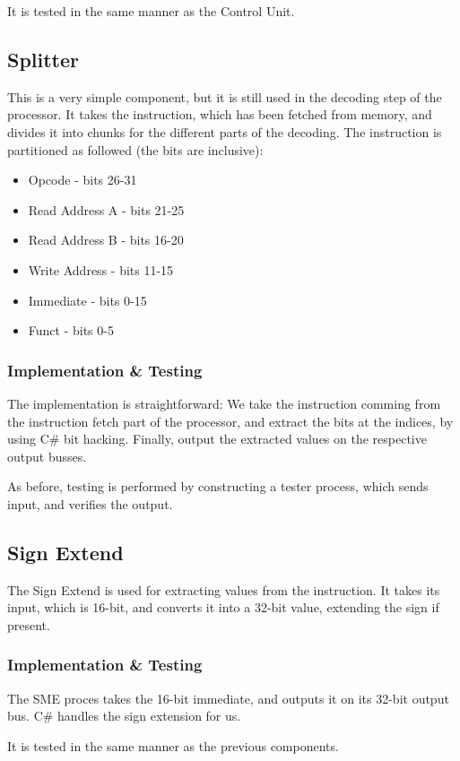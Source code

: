 It is tested in the same manner as the Control Unit.

\subsection{Splitter}
This is a very simple component, but it is still used in the decoding step of
the processor. It takes the instruction, which has been fetched from memory,
and divides it into chunks for the different parts of the decoding. The
instruction is partitioned as followed (the bits are inclusive):
\begin{itemize}
    \item Opcode - bits 26-31
    \item Read Address A - bits 21-25
    \item Read Address B - bits 16-20
    \item Write Address - bits 11-15
    \item Immediate - bits 0-15
    \item Funct - bits 0-5
\end{itemize}

\subsubsection*{Implementation \& Testing}
The implementation is straightforward: We take the instruction comming from the
instruction fetch part of the processor, and extract the bits at the indices,
by using C\# bit hacking. Finally, output the extracted values on the
respective output busses.

As before, testing is performed by constructing a tester process, which sends
input, and verifies the output.

\subsection{Sign Extend}
The Sign Extend is used for extracting values from the instruction. It takes
its input, which is 16-bit, and converts it into a 32-bit value, extending the
sign if present.

\subsubsection*{Implementation \& Testing}
The SME proces takes the 16-bit immediate, and outputs it on its 32-bit output
bus. C\# handles the sign extension for us.

It is tested in the same manner as the previous components.

